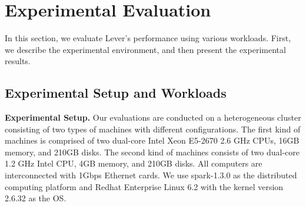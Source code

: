 \section{Experimental Evaluation}

  In this section, we evaluate Lever's performance using various workloads. First, we describe the experimental environment, and then present the experimental results.

\subsection{Experimental Setup and Workloads}

  \textbf{Experimental Setup.} Our evaluations are conducted on a heterogeneous cluster consisting of two types of machines with different configurations. The first kind of machines is comprised of two dual-core Intel Xeon E5-2670 2.6 GHz CPUs, 16GB memory, and 210GB disks. The second kind of machines consists of two dual-core 1.2 GHz Intel CPU, 4GB memory, and 210GB disks. All computers are interconnected with 1Gbps Ethernet cards. We use spark-1.3.0 as the distributed computing platform and Redhat Enterprise Linux 6.2 with the kernel version 2.6.32 as the OS.

